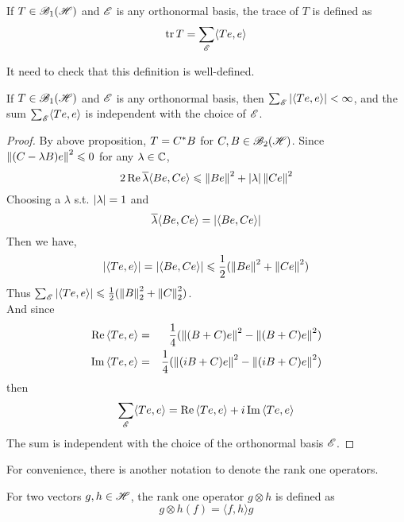 \documentclass[a4paper,11pt]{report}
\begin{document}
\begin{defn}
	If $T \in \mathscr{B}_{1}\mathscr{(H)}$ and $\mathscr{E}$ is any orthonormal basis, the trace of $T$ is defined as
	\begin{equation*}
		\operatorname{tr}{T} = \sum_{\mathscr{E}} \langle Te,e \rangle
	\end{equation*}
\end{defn}

It need to check that this definition is well-defined.

\begin{prop}
	If $T \in \mathscr{B}_{1}\mathscr{(H)}$ and $\mathscr{E}$ is any orthonormal basis, then $\sum_{\mathscr{E}} \left\lvert\langle Te,e \rangle\right\lvert < \infty$, and the sum $\sum_{\mathscr{E}} \langle Te,e \rangle$ is independent with the choice of $\mathscr{E}$.
\end{prop}
\begin{proof}
	By above proposition, $T = C^{*}B$ for $C,B \in \mathscr{B}_{2}\mathscr{(H)}$. Since\\ $\left\lVert(C-\lambda B)e\right\lVert^2 \leqslant 0$ for any $\lambda \in \mathbb{C}$,
	\begin{equation*}
		2 \operatorname{Re}{\overline{\lambda} \langle Be,Ce \rangle} \leqslant \left\lVert Be\right\lVert^2+\left\lvert\lambda\right\lvert \left\lVert Ce\right\lVert^2
	\end{equation*}
	Choosing a $\lambda$ s.t. $\left\lvert\lambda\right\lvert = 1$ and
	\begin{equation*}
		\overline{\lambda} \langle Be,Ce \rangle = \left\lvert\langle Be,Ce \rangle\right\lvert
	\end{equation*}
	Then we have,
	\begin{equation*}
		\left\lvert\langle Te,e \rangle\right\lvert = \left\lvert\langle Be,Ce \rangle\right\lvert \leqslant \frac{1}{2}(\left\lVert Be\right\lVert^2+\left\lVert Ce\right\lVert^2)
	\end{equation*}
	Thus $\sum_{\mathscr{E}} \left\lvert\langle Te,e \rangle\right\lvert \leqslant \frac{1}{2}(\left\lVert B\right\lVert_2^2+\left\lVert C\right\lVert_2^2)$. \\ 
	And since 
	\begin{eqnarray*}
		\operatorname{Re}{\langle Te,e \rangle} &=& \frac{1}{4} (\left\lVert(B+C)e\right\lVert^2 - \left\lVert(B+C)e\right\lVert^2) \\
		\operatorname{Im}{\langle Te,e \rangle} &=& \frac{1}{4} (\left\lVert(iB+C)e\right\lVert^2 - \left\lVert(iB+C)e\right\lVert^2)
	\end{eqnarray*}
	then
	\begin{equation*}
		\sum_{\mathscr{E}} \langle Te,e \rangle = \operatorname{Re}{\langle Te,e \rangle} + i\operatorname{Im}{\langle Te,e \rangle}
	\end{equation*}
	The sum is independent with the choice of the orthonormal basis $\mathscr{E}$.
\end{proof}

For convenience, there is another notation to denote the rank one operators.
\begin{defn}
	For two vectors $g,h \in \mathscr{H}$, the rank one operator $g \otimes h$ is defined as
	\begin{equation*}
		g \otimes h (f) = \langle f,h \rangle g
	\end{equation*}
\end{defn}
\end{document}
